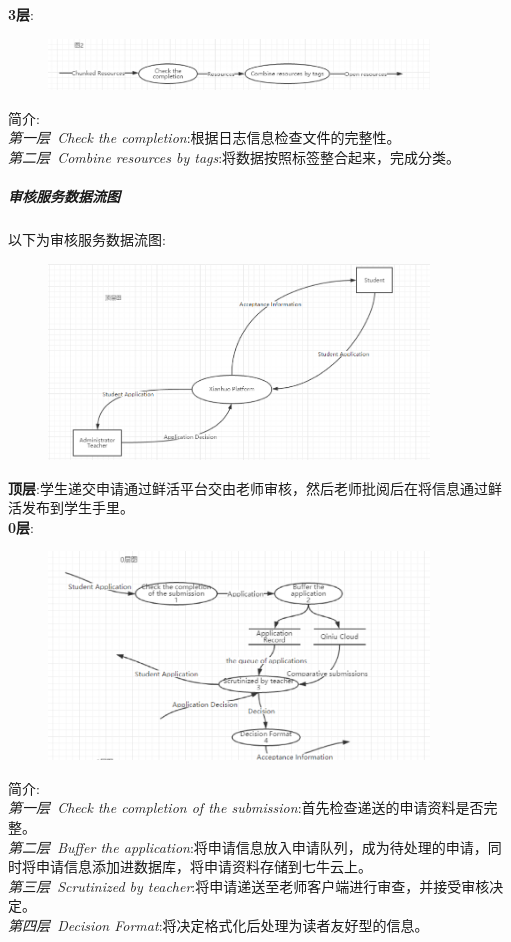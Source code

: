 \documentclass[UTF8]{ctexart}
\begin{document}
\textbf{3层}:\\
\begin{figure}[H]
\centering
\includegraphics[width = 0.9\textwidth]{upload2-df.png}
\end{figure}
简介:\\
\emph{第一层~Check the completion}:根据日志信息检查文件的完整性。\\
\emph{第二层~Combine resources by tags}:将数据按照标签整合起来，完成分类。\\

\subparagraph*{审核服务数据流图}
以下为审核服务数据流图:\\
\begin{figure}[H]
\centering
\includegraphics[width = 0.9\textwidth]{download-df.png}
\end{figure}

\textbf{顶层}:学生递交申请通过鲜活平台交由老师审核，然后老师批阅后在将信息通过鲜活发布到学生手里。\\

\textbf{0层}:\\
\begin{figure}[H]
\centering
\includegraphics[width = 0.9\textwidth]{download0-df.png}
\end{figure}
简介:\\
\emph{第一层~Check the completion of the submission}:首先检查递送的申请资料是否完整。\\
\emph{第二层~Buffer the application}:将申请信息放入申请队列，成为待处理的申请，同时将申请信息添加进数据库，将申请资料存储到七牛云上。\\
\emph{第三层~Scrutinized by teacher}:将申请递送至老师客户端进行审查，并接受审核决定。\\
\emph{第四层~Decision Format}:将决定格式化后处理为读者友好型的信息。\\
\end{document}
